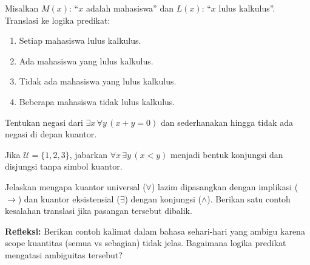 \documentclass[../main]{subfiles}
\begin{document}

\begin{latihan}
  \item Misalkan $M(x)$: ``$x$ adalah mahasiswa'' dan $L(x)$: ``$x$ lulus kalkulus''. Translasi ke logika predikat:
  \begin{enumerate}
    \item Setiap mahasiswa lulus kalkulus.
    \item Ada mahasiswa yang lulus kalkulus.
    \item Tidak ada mahasiswa yang lulus kalkulus.
    \item Beberapa mahasiswa tidak lulus kalkulus.
  \end{enumerate}
  \item Tentukan negasi dari $\exists x \, \forall y \, (x + y = 0)$ dan sederhanakan hingga tidak ada negasi di depan kuantor.
  \item Jika $\mathcal{U} = \{1, 2, 3\}$, jabarkan $\forall x \, \exists y \, (x < y)$ menjadi bentuk konjungsi dan disjungsi tanpa simbol kuantor.
  \item Jelaskan mengapa kuantor universal ($\forall$) lazim dipasangkan dengan implikasi ($\rightarrow$) dan kuantor eksistensial ($\exists$) dengan konjungsi ($\land$). Berikan satu contoh kesalahan translasi jika pasangan tersebut dibalik.
  \item \textbf{Refleksi:} Berikan contoh kalimat dalam bahasa sehari-hari yang ambigu karena scope kuantitas (semua vs sebagian) tidak jelas. Bagaimana logika predikat mengatasi ambiguitas tersebut?
\end{latihan}

\end{document}
